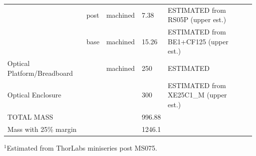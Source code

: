 \documentclass[12pt]{article}
\begin{document}
\begin{landscape}
\begin{center}
\begin{longtable}{| p{3.25cm} | p{2.2cm} | p{3cm} | p{1.75cm} | p{2.5cm} | p{1.55cm} | p{5cm} |}
          & post  & machined & 7.38  & ESTIMATED from RS05P (upper est.) &       &  \\
          & base  & machined & 15.26 & ESTIMATED from BE1+CF125 (upper est.) &       &  \\ \hline
    Optical Platform/Breadboard &       & machined & 250   & ESTIMATED &       &  \\ \hline
    Optical Enclosure &       &       & 300   & ESTIMATED from XE25C1\_M (upper est.) &       &  \\ \hline
    TOTAL MASS &       &       & 996.88 &       &       &  \\
    Mass with 25\% margin &       &       & 1246.1 &       &       &  \\ \hline
\hline
\end{longtable}
$^1$Estimated from ThorLabs miniseries post MS075.
\end{center}
\end{landscape}

\clearpage
\end{document}
